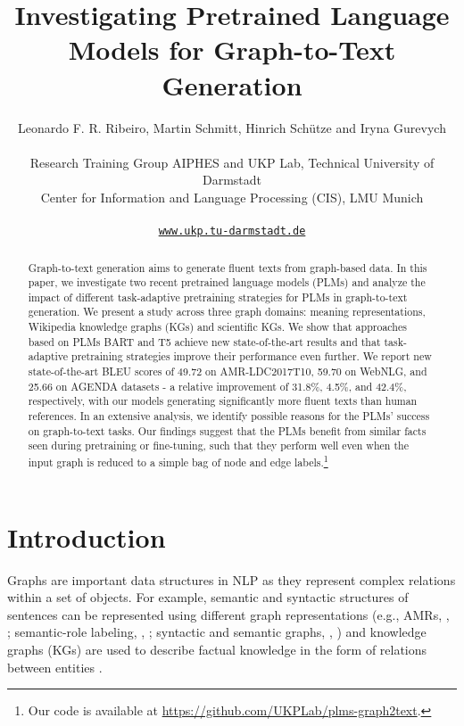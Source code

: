\documentclass[11pt]{article}
\title{Investigating Pretrained Language Models for Graph-to-Text Generation}
\author{Leonardo F. R. Ribeiro, Martin Schmitt, Hinrich Sch{\"u}tze and Iryna Gurevych \vspace{1mm} \\
\rule{0pt}{2.5ex}
  Research Training Group AIPHES and UKP Lab, Technical University of Darmstadt\\
  Center for Information and Language Processing (CIS), LMU Munich \\
  \rule{0pt}{2.5ex}
 \texttt{\href{https://www.ukp.tu-darmstadt.de}{www.ukp.tu-darmstadt.de}}
}
\begin{document}
\maketitle
\begin{abstract}
Graph-to-text generation aims to generate fluent texts from graph-based data. In this paper, we investigate two recent pretrained language models (PLMs) and analyze the impact of different task-adaptive pretraining strategies for PLMs in graph-to-text generation. We present a study across three graph domains: meaning representations, Wikipedia knowledge graphs (KGs) and scientific KGs. We show that approaches based on PLMs BART and T5 achieve new state-of-the-art results and that task-adaptive pretraining strategies improve their performance even further. We report new state-of-the-art BLEU scores of 49.72 on AMR-LDC2017T10, 59.70 on WebNLG, and 25.66 on AGENDA datasets - a relative improvement of 31.8\%, 4.5\%, and 42.4\%, respectively, with our models generating significantly more fluent texts than human references.  In an extensive analysis, we identify possible reasons for the PLMs’ success on graph-to-text tasks. Our findings suggest that the PLMs benefit from similar facts seen during pretraining or fine-tuning, such that they perform well even when the input graph is reduced to a simple bag of node and edge labels.\footnote{Our code is available at \href{https://github.com/UKPLab/plms-graph2text}{https://github.com/UKPLab/plms-graph2text}.}
\end{abstract}



\section{Introduction}

Graphs are important data structures in NLP as they represent complex relations within a set of objects. For example, semantic and syntactic structures of sentences can be represented using different graph representations (e.g., AMRs, \citeauthor{banarescu-etal-2013-abstract}, \citeyear{banarescu-etal-2013-abstract}; semantic-role labeling, \citeauthor{surdeanu-etal-2008-conll}, \citeyear{surdeanu-etal-2008-conll}; syntactic and semantic graphs, \citeauthor{belz-etal-2011-first}, \citeyear{belz-etal-2011-first}) and knowledge graphs (KGs) are used to describe factual knowledge in the form of relations between entities \cite{gardent-etal-2017-webnlg, VOUGIOUKLIS20181, koncel-kedziorski-etal-2019-text}.
\end{document}
